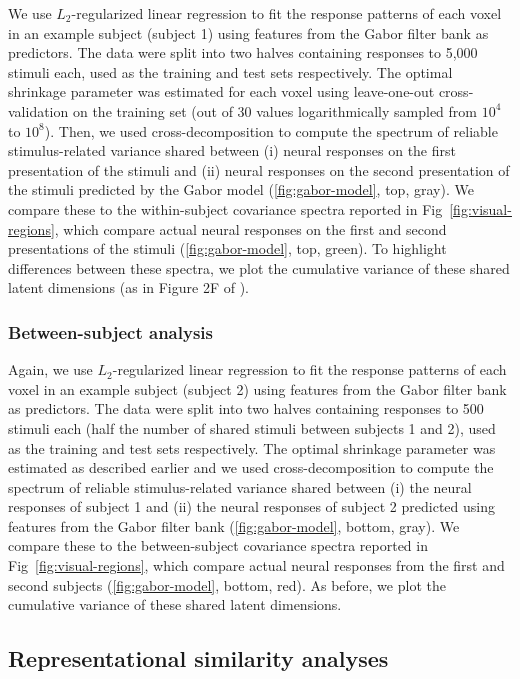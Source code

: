 \documentclass[10pt]{article}
\begin{document}
We use \(L_2\)-regularized linear regression to fit the response patterns of each voxel in an example subject (subject 1) using features from the Gabor filter bank as predictors. The data were split into two halves containing responses to 5,000 stimuli each, used as the training and test sets respectively. The optimal shrinkage parameter was estimated for each voxel using leave-one-out cross-validation on the training set (out of 30 values logarithmically sampled from \(10^4\) to \(10^8\)). Then, we used cross-decomposition to compute the spectrum of reliable stimulus-related variance shared between (i) neural responses on the first presentation of the stimuli and (ii) neural responses on the second presentation of the stimuli predicted by the Gabor model (\ref{fig:gabor-model}, top, gray). We compare these to the within-subject covariance spectra reported in Fig~\ref{fig:visual-regions}, which compare actual neural responses on the first and second presentations of the stimuli (\ref{fig:gabor-model}, top, green). To highlight differences between these spectra, we plot the cumulative variance of these shared latent dimensions (as in Figure 2F of \textcite{Stringer2019}).

\subsubsection{Between-subject analysis}\label{between-subject-analysis}

Again, we use \(L_2\)-regularized linear regression to fit the response patterns of each voxel in an example subject (subject 2) using features from the Gabor filter bank as predictors. The data were split into two halves containing responses to 500 stimuli each (half the number of shared stimuli between subjects 1 and 2), used as the training and test sets respectively. The optimal shrinkage parameter was estimated as described earlier and we used cross-decomposition to compute the spectrum of reliable stimulus-related variance shared between (i) the neural responses of subject 1 and (ii) the neural responses of subject 2 predicted using features from the Gabor filter bank (\ref{fig:gabor-model}, bottom, gray). We compare these to the between-subject covariance spectra reported in Fig~\ref{fig:visual-regions}, which compare actual neural responses from the first and second subjects (\ref{fig:gabor-model}, bottom, red). As before, we plot the cumulative variance of these shared latent dimensions.

\subsection{Representational similarity analyses}\label{representational-similarity-analyses}
\end{document}
